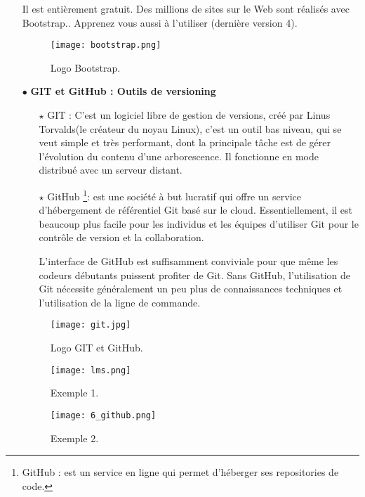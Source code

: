 \begin{itemize}
Il est entièrement gratuit. Des millions de sites sur le Web sont réalisés avec Bootstrap.. Apprenez vous aussi à l’utiliser (dernière version 4).\cite{wiki:Bootstrap_(front-end_framework)}
\begin{figure}[ht]
	\centering
	\texttt{[image: bootstrap.png]}
	\caption{Logo Bootstrap.}
	\label{fig:Logo bootstrap }
\end{figure}
\FloatBarrier

\medskip	



\item[$\bullet$] \textbf{ GIT et GitHub : Outils de versioning}

	\begin{itemize}	
	\item[$\star$] GIT :  C'est un logiciel libre de gestion de versions, créé par Linus Torvalds(le créateur du noyau Linux), c’est un outil bas niveau, qui se veut simple et très performant, dont la principale tâche est de gérer l’évolution du contenu d’une arborescence. Il fonctionne en mode distribué avec un serveur distant\cite{wiki:git}.
	\item[$\star$] GitHub \footnote{GitHub : est un service en ligne qui permet d'héberger ses repositories de code.}: est une société à but lucratif qui offre un service d’hébergement de référentiel Git basé sur le cloud. Essentiellement, il est beaucoup plus facile pour les individus et les équipes d’utiliser Git pour le contrôle de version et la collaboration.
	
	L’interface de GitHub est suffisamment conviviale pour que même les codeurs débutants puissent profiter de Git. Sans GitHub, l’utilisation de Git nécessite généralement un peu plus de connaissances techniques et l’utilisation de la ligne de commande.

\end{itemize}



\begin{figure}[ht]
	\centering
	\texttt{[image: git.jpg]}
	\caption{Logo GIT et GitHub.}
	\label{fig:GIT et GitHub }
\end{figure}
\FloatBarrier

\begin{figure}[ht]
	\centering
	\texttt{[image: lms.png]}
	\caption{Exemple 1.}
	\label{fig:Exemple1}
\end{figure}
\FloatBarrier
\begin{figure}[ht]
	\centering
	\texttt{[image: 6\_github.png]}
	\caption{Exemple 2.}
	\label{fig:Exemple2 }
\end{figure}
\FloatBarrier
\medskip







\end{itemize}
